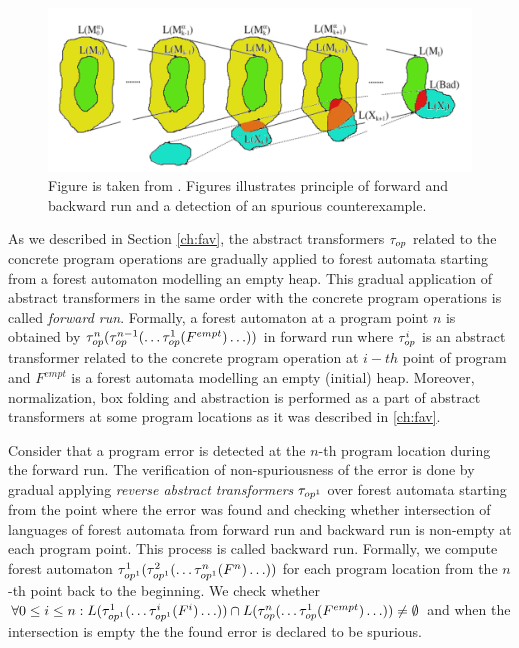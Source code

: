 \begin{figure}[t]
	\centering
	\includegraphics[width=1\linewidth]{fig/artmc.png}
	\caption{
		Figure is taken from \cite{artmc}.
		Figures illustrates principle of forward and backward run and
		a detection of an spurious counterexample.}
	\label{fig:bwrun}
\end{figure}

As we described in Section \ref{ch:fav}, the abstract transformers $\tau_{op}$
related to the concrete program operations are gradually applied to forest automata
starting from a forest automaton modelling an empty heap.
This gradual application of abstract transformers in the same order
with the concrete program operations is called \emph{forward run}.
Formally, a forest automaton at a program point $n$ is obtained by
$\tau_{op}^n(\tau_{op}^{n-1}(\ldots \tau_{op}^{1}(F^{empt}) \ldots))$ in forward run
where $\tau_{op}^i$ is an abstract transformer related to the concrete
program operation at $i-th$ point of program and $F^{empt}$ is
a forest automata modelling an empty (initial) heap.
Moreover, normalization, box folding and abstraction is performed
as a part of abstract transformers at some program locations as
it was described in \ref{ch:fav}.

Consider that a program error is detected at the $n$-th program location
during the forward run.
The verification of non-spuriousness of the error is done by gradual applying
\emph{reverse abstract transformers} $\tau_{op^1}$ over forest automata
starting from the point where the error was found
and checking whether intersection of languages of forest automata from forward run
and backward run is non-empty at each program point.
This process is called backward run.
Formally, we compute forest automaton $\tau_{op^1}^1(\tau_{op^1}^{2}(\ldots \tau_{op^1}^{n}(F^{n}) \ldots))$
for each program location from the $n$-th point back to the beginning.
We check whether $\forall 0 \leq i \leq n: L(\tau_{op^1}^1(\ldots \tau_{op^1}^{i}(F^{i}) \ldots)) \cap
L(\tau_{op}^n(\ldots \tau_{op}^{1}(F^{empt}) \ldots)) \neq \emptyset$
and when the intersection is empty the the found error is declared
to be spurious.

